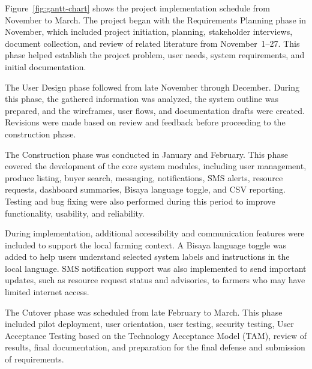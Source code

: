 Figure~\ref{fig:gantt-chart} shows the project implementation schedule from November to March. The project began with the Requirements Planning phase in November, which included project initiation, planning, stakeholder interviews, document collection, and review of related literature from November~1--27. This phase helped establish the project problem, user needs, system requirements, and initial documentation.

The User Design phase followed from late November through December. During this phase, the gathered information was analyzed, the system outline was prepared, and the wireframes, user flows, and documentation drafts were created. Revisions were made based on review and feedback before proceeding to the construction phase.

The Construction phase was conducted in January and February. This phase covered the development of the core system modules, including user management, produce listing, buyer search, messaging, notifications, SMS alerts, resource requests, dashboard summaries, Bisaya language toggle, and CSV reporting. Testing and bug fixing were also performed during this period to improve functionality, usability, and reliability.

During implementation, additional accessibility and communication features were included to support the local farming context. A Bisaya language toggle was added to help users understand selected system labels and instructions in the local language. SMS notification support was also implemented to send important updates, such as resource request status and advisories, to farmers who may have limited internet access.

The Cutover phase was scheduled from late February to March. This phase included pilot deployment, user orientation, user testing, security testing, User Acceptance Testing based on the Technology Acceptance Model (TAM), review of results, final documentation, and preparation for the final defense and submission of requirements.